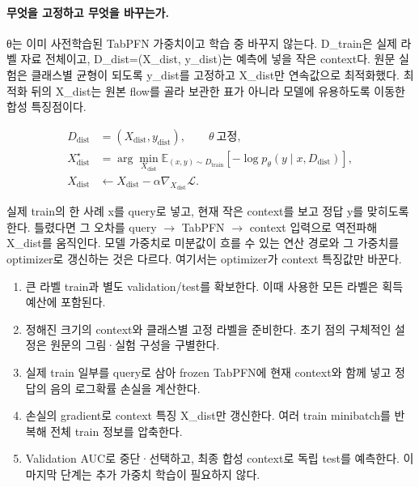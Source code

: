 \paragraph{무엇을 고정하고 무엇을 바꾸는가.} θ는 이미 사전학습된 TabPFN 가중치이고 학습 중 바꾸지 않는다. D\_\allowbreak{}train은 실제 라벨 자료 전체이고, D\_\allowbreak{}dist=\allowbreak{}(X\_\allowbreak{}dist, y\_\allowbreak{}dist)는 예측에 넣을 작은 context다. 원문 실험은 클래스별 균형이 되도록 y\_\allowbreak{}dist를 고정하고 X\_\allowbreak{}dist만 연속값으로 최적화했다. 최적화 뒤의 X\_\allowbreak{}dist는 원본 flow를 골라 보관한 표가 아니라 모델에 유용하도록 이동한 합성 특징점이다.


\begin{align}
       D_{\mathrm{dist}}&=(X_{\mathrm{dist}},y_{\mathrm{dist}}),\qquad \theta\ \text{고정},\\
       X_{\mathrm{dist}}^\star
       &=\arg\min_{X_{\mathrm{dist}}}
          \mathbb E_{(x,y)\sim D_{\mathrm{train}}}
             [-\log p_\theta(y\mid x,D_{\mathrm{dist}})],\\
       X_{\mathrm{dist}}&\leftarrow X_{\mathrm{dist}}
                  -\alpha\nabla_{X_{\mathrm{dist}}}\mathcal L.
    \end{align}

실제 train의 한 사례 x를 query로 넣고, 현재 작은 context를 보고 정답 y를 맞히도록 한다. 틀렸다면 그 오차를 query \ensuremath{\rightarrow} TabPFN \ensuremath{\rightarrow} context 입력으로 역전파해 X\_\allowbreak{}dist를 움직인다. 모델 가중치로 미분값이 흐를 수 있는 연산 경로와 그 가중치를 optimizer로 갱신하는 것은 다르다. 여기서는 optimizer가 context 특징값만 바꾼다.


\begin{enumerate}[leftmargin=*,itemsep=3pt]

\item 큰 라벨 train과 별도 validation/\allowbreak{}test를 확보한다. 이때 사용한 모든 라벨은 획득 예산에 포함된다.

\item 정해진 크기의 context와 클래스별 고정 라벨을 준비한다. 초기 점의 구체적인 설정은 원문의 그림·실험 구성을 구별한다.

\item 실제 train 일부를 query로 삼아 frozen TabPFN에 현재 context와 함께 넣고 정답의 음의 로그확률 손실을 계산한다.

\item 손실의 gradient로 context 특징 X\_\allowbreak{}dist만 갱신한다. 여러 train minibatch를 반복해 전체 train 정보를 압축한다.

\item Validation AUC로 중단·선택하고, 최종 합성 context로 독립 test를 예측한다. 이 마지막 단계는 추가 가중치 학습이 필요하지 않다.

\end{enumerate}

